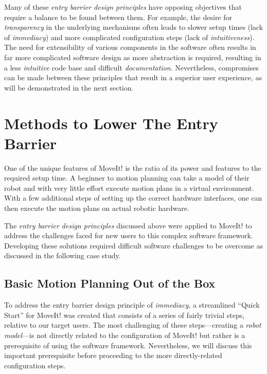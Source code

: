 \documentclass[10pt,journal,compsoc]{joser1}
\begin{document}
{Many of these \textit{entry barrier design principles} have opposing objectives that require a balance to be
found between them. For example, the desire for \textit{transparency} in the
underlying mechanisms often leads to slower setup times (lack of
\textit{immediacy}) and more complicated configuration steps (lack of
\textit{intuitiveness}). The need for extensibility of various components in the
software often results in far more complicated software design as more
abstraction is required, resulting in a less \textit{intuitive} code base and
difficult \textit{documentation}. Nevertheless, compromises can be made between
these principles that result in a superior user experience, as will be
demonstrated in the next section.

\section{Methods to Lower The Entry Barrier}
\label{sec::lowering_barriers}

One of the unique features of MoveIt! is the ratio of its power and features to
the required setup time. A beginner to motion planning can take a model of their
robot and with very little effort execute motion plans in a virtual environment.
With a few additional steps of setting up the correct hardware interfaces, one
can then execute the motion plans on actual robotic hardware.

The \textit{entry barrier design principles} discussed above were applied to
MoveIt! to address the challenges faced for new users to this complex software
framework. Developing these solutions required difficult software challenges to
be overcome as discussed in the following case study.

\subsection{Basic Motion Planning Out of the Box}

To address the entry barrier design principle of \textit{immediacy}, a
streamlined ``Quick Start'' for MoveIt! was created that consists of a series of
fairly trivial steps, relative to our target users. The most challenging of
these steps---creating a \textit{robot model}---is not directly related to the
configuration of MoveIt! but rather is a prerequisite of using the software
framework. Nevertheless, we will discuss this important prerequisite before
proceeding to the more directly-related configuration steps.

}
\end{document}
